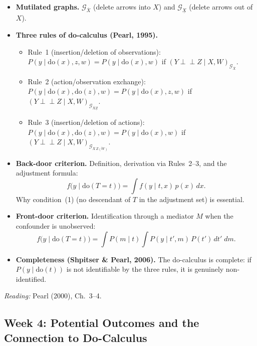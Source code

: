 \documentclass[12pt]{article}
\begin{document}
\begin{itemize}
  \item \textbf{Mutilated graphs.}
    $\mathcal{G}_{\overline{X}}$ (delete arrows into $X$) and
    $\mathcal{G}_{\underline{X}}$ (delete arrows out of $X$).

  \item \textbf{Three rules of do-calculus (Pearl, 1995).}
    \begin{itemize}
      \item Rule~1 (insertion/deletion of observations):
        $P(y \mid \mathrm{do}(x), z, w) = P(y \mid \mathrm{do}(x), w)$
        if $(Y \perp\!\!\!\perp Z \mid X,W)_{\mathcal{G}_{\overline{X}}}$.
      \item Rule~2 (action/observation exchange):
        $P(y \mid \mathrm{do}(x),\mathrm{do}(z),w)
         = P(y \mid \mathrm{do}(x),z,w)$
        if $(Y \perp\!\!\!\perp Z \mid X,W)_{\mathcal{G}_{\overline{X}\underline{Z}}}$.
      \item Rule~3 (insertion/deletion of actions):
        $P(y \mid \mathrm{do}(x),\mathrm{do}(z),w)
         = P(y \mid \mathrm{do}(x),w)$
        if $(Y \perp\!\!\!\perp Z \mid X,W)_{\mathcal{G}_{\overline{X}\,\overline{Z(W)}}}$.
    \end{itemize}

  \item \textbf{Back-door criterion.}
    Definition, derivation via Rules~2--3, and the adjustment formula:
    \[
      f\!\bigl(y \mid \mathrm{do}(T{=}t)\bigr)
      = \int f(y \mid t,x)\, p(x)\, dx.
    \]
    Why condition~(1) (no descendant of $T$ in the adjustment set) is
    essential.

  \item \textbf{Front-door criterion.}
    Identification through a mediator $M$ when the confounder is
    unobserved:
    \[
      f\!\bigl(y \mid \mathrm{do}(T{=}t)\bigr)
      = \int P(m \mid t) \int P(y \mid t', m)\, P(t')\, dt'\; dm.
    \]

  \item \textbf{Completeness (Shpitser \& Pearl, 2006).}
    The do-calculus is complete: if $P(y \mid \mathrm{do}(t))$ is not
    identifiable by the three rules, it is genuinely non-identified.
\end{itemize}

\noindent\textit{Reading:} Pearl (2000), Ch.~3--4.

\subsection{Week 4: Potential Outcomes and the Connection to Do-Calculus}
\end{document}
